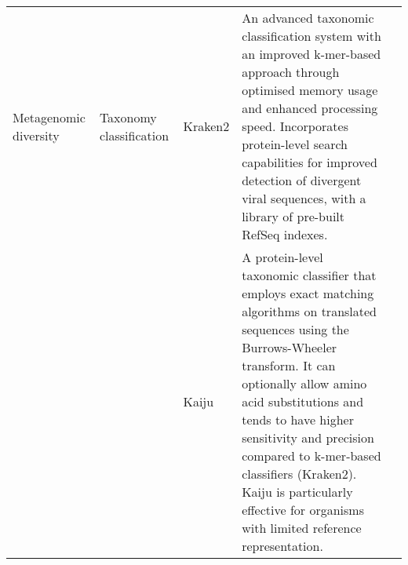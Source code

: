 \begin{longtable}{p{2cm}p{1.8cm}p{1.8cm}p{8.3cm}p{1cm}}
Metagenomic diversity & Taxonomy classification & Kraken2 & An advanced taxonomic classification system with an improved k-mer-based approach through optimised memory usage and enhanced processing speed. Incorporates protein-level search capabilities for improved detection of divergent viral sequences, with a library of pre-built RefSeq indexes. & \cite{Wood2019-jl} \\
\cmidrule{3-5}
 &  & Kaiju & A protein-level taxonomic classifier that employs exact matching algorithms on translated sequences using the Burrows-Wheeler transform. It can optionally allow amino acid substitutions and tends to have higher sensitivity and precision compared to k-mer-based classifiers (Kraken2). Kaiju is particularly effective for organisms with limited reference representation. & \cite{Menzel2016-tz} \\
\midrule


\end{longtable}
